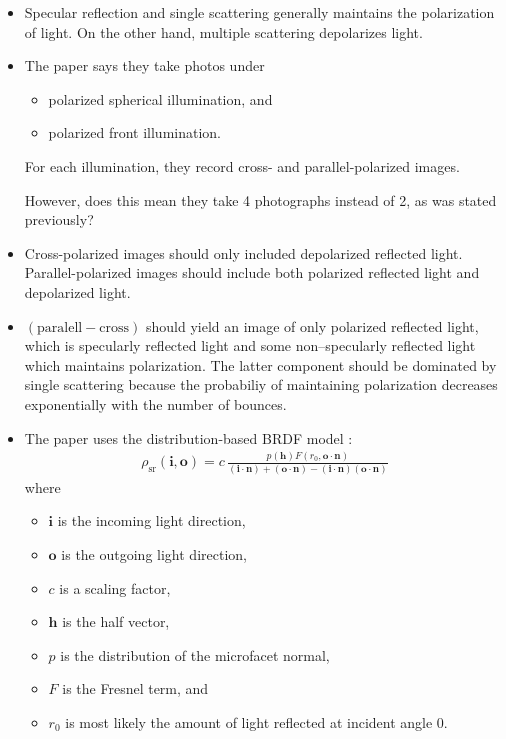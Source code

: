 \documentclass[10pt]{article}
\newcommand{\ve}[1]{\mathbf{#1}}
\begin{document}
  	\begin{itemize}
  		\item Specular reflection and single scattering generally maintains the polarization of light.  On the other hand, multiple scattering depolarizes light.

  		\item The paper says they take photos under
  		\begin{itemize}
  			\item polarized spherical illumination, and
  			\item polarized front illumination.
  		\end{itemize}
  		For each illumination, they record cross- and parallel-polarized images.

  		However, does this mean they take 4 photographs instead of 2, as was stated previously?

  		\item Cross-polarized images should only included depolarized reflected light. Parallel-polarized images should include both polarized reflected light and depolarized light.

  		\item $(\mbox{paralell} - \mbox{cross})$ should yield an image of only polarized reflected light, which is specularly reflected light and some non--specularly reflected light which maintains polarization.
  		 The latter component should be dominated by single scattering because the probabiliy of maintaining polarization decreases exponentially with the number of bounces.
  
		\item The paper uses the distribution-based BRDF model \cite{Ashikhmin:2006}:
		\begin{align*}
			\rho_{\mathrm{sr}}(\ve{i},\ve{o}) = c\, \frac{p(\ve{h}) F(r_0, \ve{o}\cdot \ve{n})}{(\ve{i}\cdot\ve{n}) + (\ve{o}\cdot\ve{n}) - (\ve{i}\cdot\ve{n})(\ve{o}\cdot\ve{n})}
		\end{align*}
		where
		\begin{itemize}
			\item $\ve{i}$ is the incoming light direction,
			\item $\ve{o}$ is the outgoing light direction,
			\item $c$ is a scaling factor,
			\item $\ve{h}$ is the half vector,
			\item $p$ is the distribution of the microfacet normal,
			\item $F$ is the Fresnel term, and
			\item $r_0$ is most likely the amount of light reflected at incident angle $0$.
		\end{itemize}


\end{itemize}
\end{document}
